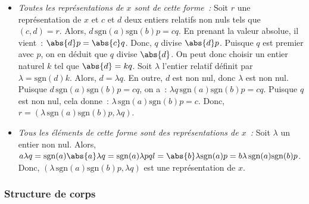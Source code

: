 \begin{itemize}[nosep]
\begin{itemize}[nosep]
            \item \emph{Toutes les représentations de $x$ sont de cette forme :} Soit $r$ une représentation de $x$ et $c$ et $d$ deux entiers relatifs non nuls tels que $(c, d) = r$. 
                Alors, $d \, \mathrm{sgn}(a) \mathrm{sgn}(b) p = c q$.
                En prenant la valeur absolue, il vient : $\abs{d} p = \abs{c} q$. 
                Donc, $q$ divise $\abs{d} p$. 
                Puisque $q$ est premier avec $p$, on en déduit que $q$ divise $\abs{d}$.
                On peut donc choisir un entier naturel $k$ tel que $\abs{d} = k q$.
                Soit $\lambda$ l'entier relatif définit par $\lambda = \mathrm{sgn}(d) k$. 
                Alors, $d = \lambda q$.
                En outre, $d$ est non nul, donc $\lambda$ est non nul. 
                Puisque $d \, \mathrm{sgn}(a) \mathrm{sgn}(b) p = c q$, on a : $\lambda q \, \mathrm{sgn}(a) \mathrm{sgn}(b) p = c q$.
                Puisque $q$ est non nul, cela donne : $\lambda \, \mathrm{sgn}(a) \mathrm{sgn}(b) p = c$.
                Donc, $r = (\lambda \, \mathrm{sgn}(a) \mathrm{sgn}(b) p, \lambda q)$.
            \item \emph{Tous les éléments de cette forme sont des représentations de $x$ :} Soit $\lambda$ un entier non nul.
                Alors, $a \lambda q = \mathrm{sgn}(a) \abs{a} \lambda q = \mathrm{sgn}(a) \lambda p q l = \abs{b} \lambda \mathrm{sgn}(a) p = b \lambda \, \mathrm{sgn}(a) \mathrm{sgn}(b) p$.
                Donc, $(\lambda \, \mathrm{sgn}(a) \mathrm{sgn}(b) p, \lambda q)$ est une représentation de $x$.
        \end{itemize}
\end{itemize}

\done

\subsubsection{Structure de corps}

